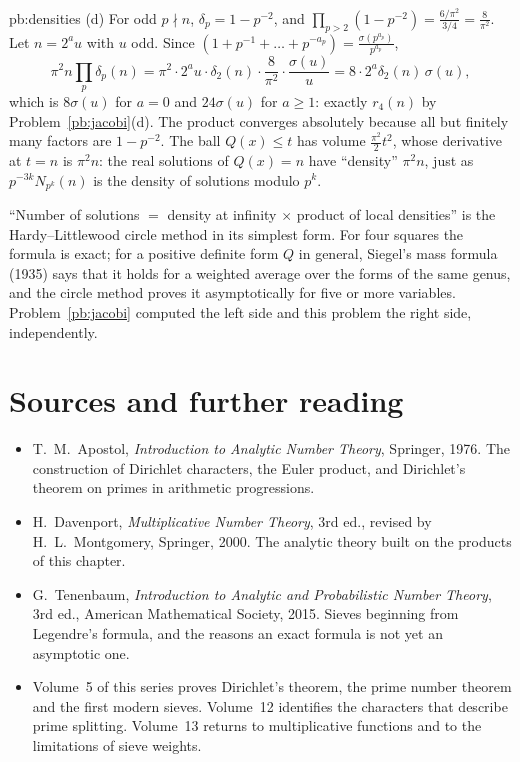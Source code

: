 \begin{solution}{pb:densities}
(d) For odd $p\nmid n$, $\delta_p=1-p^{-2}$, and $\prod_{p>2}(1-p^{-2})=\frac{6/\pi^2}{3/4}=\frac8{\pi^2}$. Let $n=2^au$ with $u$ odd. Since $(1+p^{-1}+\dots+p^{-a_p})=\frac{\sigma(p^{a_p})}{p^{a_p}}$,
\[
\pi^2n\prod_p\delta_p(n)=\pi^2\cdot2^au\cdot\delta_2(n)\cdot\frac8{\pi^2}\cdot\frac{\sigma(u)}u=8\cdot2^a\delta_2(n)\,\sigma(u),
\]
which is $8\sigma(u)$ for $a=0$ and $24\sigma(u)$ for $a\ge1$: exactly $r_4(n)$ by Problem~\ref{pb:jacobi}(d). The product converges absolutely because all but finitely many factors are
$1-p^{-2}$. The ball $Q(x)\le t$ has volume $\frac{\pi^2}2t^2$, whose derivative at $t=n$ is $\pi^2n$: the real solutions of $Q(x)=n$ have ``density'' $\pi^2n$, just as
$p^{-3k}N_{p^k}(n)$ is the density of solutions modulo $p^k$.


\leads ``Number of solutions $=$ density at infinity $\times$ product of local densities'' is the Hardy--Littlewood circle method in its simplest form. For four squares the
formula is exact; for a positive definite form $Q$ in general, Siegel's mass formula (1935) says that it holds for a weighted average over the forms of the same genus, and
the circle method proves it asymptotically for five or more variables. Problem~\ref{pb:jacobi} computed the left side and this problem the right side, independently.
\end{solution}

\section*{Sources and further reading}

\begin{itemize}
\item T.~M.~Apostol, \emph{Introduction to Analytic Number Theory}, Springer, 1976. The construction of Dirichlet characters, the Euler product, and Dirichlet's theorem on primes in arithmetic progressions.
\item H.~Davenport, \emph{Multiplicative Number Theory}, 3rd ed., revised by H.~L.~Montgomery, Springer, 2000. The analytic theory built on the products of this chapter.
\item G.~Tenenbaum, \emph{Introduction to Analytic and Probabilistic Number Theory}, 3rd ed., American Mathematical Society, 2015. Sieves beginning from Legendre's formula, and the reasons an exact formula is not yet an asymptotic one.
\item Volume~5 of this series proves Dirichlet's theorem, the prime number theorem and the first modern sieves. Volume~12 identifies the characters that describe prime splitting. Volume~13 returns to multiplicative functions and to the limitations of sieve weights.
\end{itemize}
